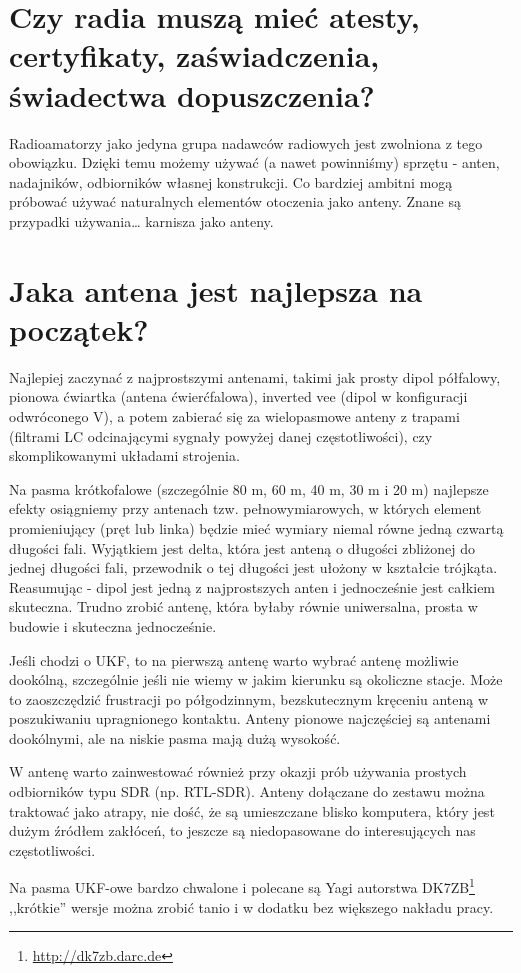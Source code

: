 \documentclass[a4paper,12pt]{article}
\begin{document}
\section{Czy radia muszą mieć atesty, certyfikaty, zaświadczenia, świadectwa dopuszczenia?}
Radioamatorzy jako jedyna grupa nadawców radiowych jest zwolniona z tego obowiązku. Dzięki temu możemy używać (a nawet powinniśmy) sprzętu - anten, nadajników, odbiorników własnej konstrukcji. Co bardziej ambitni mogą próbować używać naturalnych elementów otoczenia jako anteny. Znane są przypadki używania… karnisza jako anteny.

\section{Jaka antena jest najlepsza na początek?}
Najlepiej zaczynać z najprostszymi antenami, takimi jak prosty dipol półfalowy, pionowa ćwiartka (antena ćwierćfalowa), inverted vee (dipol w konfiguracji odwróconego V), a potem zabierać się za wielopasmowe anteny z trapami (filtrami LC odcinającymi sygnały powyżej danej częstotliwości), czy skomplikowanymi układami strojenia.

Na pasma krótkofalowe (szczególnie 80 m, 60 m, 40 m, 30 m i 20 m) najlepsze efekty osiągniemy przy antenach tzw. pełnowymiarowych, w których element promieniujący (pręt lub linka) będzie mieć wymiary niemal równe jedną czwartą długości fali. Wyjątkiem jest delta, która jest anteną o długości zbliżonej do jednej długości fali, przewodnik o tej długości jest ułożony w kształcie trójkąta. Reasumując - dipol jest jedną z najprostszych anten i jednocześnie jest całkiem skuteczna. Trudno zrobić antenę, która byłaby równie uniwersalna, prosta w budowie i skuteczna jednocześnie.

Jeśli chodzi o UKF, to na pierwszą antenę warto wybrać antenę możliwie dookólną, szczególnie jeśli nie wiemy w jakim kierunku są okoliczne stacje. Może to zaoszczędzić frustracji po półgodzinnym, bezskutecznym kręceniu anteną w poszukiwaniu upragnionego kontaktu. Anteny pionowe najczęściej są antenami dookólnymi, ale na niskie pasma mają dużą wysokość.

W antenę warto zainwestować również przy okazji prób używania prostych odbiorników typu SDR (np. RTL-SDR). Anteny dołączane do zestawu można traktować jako atrapy, nie dość, że są umieszczane blisko komputera, który jest dużym źródłem zakłóceń, to jeszcze są niedopasowane do interesujących nas częstotliwości.

Na pasma UKF-owe bardzo chwalone i polecane są Yagi autorstwa DK7ZB\footnote{\url{http://dk7zb.darc.de}} ,,krótkie'' wersje można zrobić tanio i w dodatku bez większego nakładu pracy.
\end{document}
